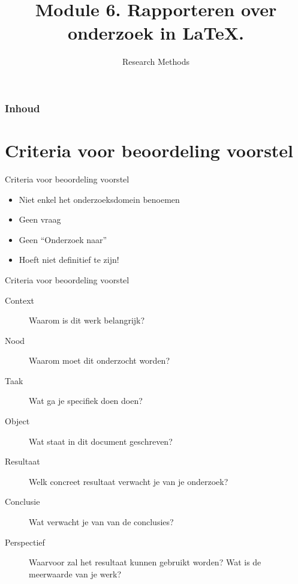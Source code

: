 \documentclass[aspectratio=169]{beamer}
\title{Module 6. Rapporteren over onderzoek in \LaTeX{}.}
\subtitle{Research Methods}
\author{\lecturers}   %
\date{\academicyear}
\begin{document}
\begin{frame}
  \maketitle
\end{frame}

\begin{frame}
  \frametitle{Inhoud}

  \tableofcontents
\end{frame}


\section{Criteria voor beoordeling voorstel}

\begin{frame}{Criteria voor beoordeling voorstel}
  
  
  \begin{itemize}
    \item Niet enkel het onderzoeksdomein benoemen
    \item Geen vraag
    \item Geen ``Onderzoek naar''
    \item Hoeft niet definitief te zijn!
  \end{itemize}
  
  
  
\end{frame}

\begin{frame}{Criteria voor beoordeling voorstel}
  
  \small
  \begin{description}
    \item[Context] Waarom is dit werk belangrijk?
    \item[Nood] Waarom moet dit onderzocht worden?
    \item[Taak] Wat ga je specifiek doen doen?
    \item[Object] Wat staat in dit document geschreven?
    \item[Resultaat] Welk concreet resultaat verwacht je van je onderzoek?
    \item[Conclusie] Wat verwacht je van van de conclusies?
    \item[Perspectief] Waarvoor zal het resultaat kunnen gebruikt worden? Wat is de meerwaarde van je werk?
  \end{description}
  
  
\end{frame}
\end{document}
